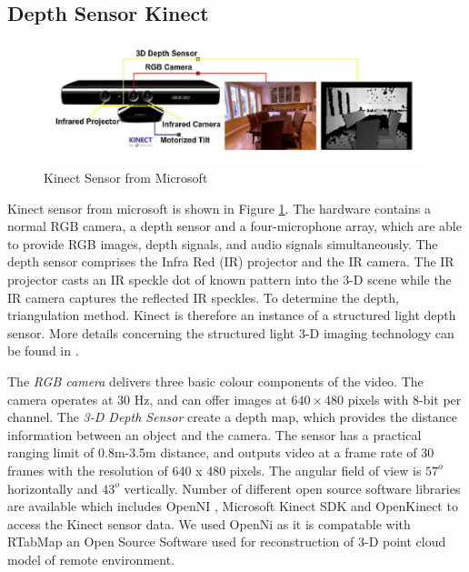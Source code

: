 \subsection{Depth Sensor Kinect}
\begin{figure}
	\includegraphics[width=\linewidth,keepaspectratio]{Chapter7/fig/kinect}
	\caption{Kinect Sensor from Microsoft}	\label{fig:Kinect}
\end{figure}
Kinect sensor from microsoft is shown in Figure \ref{fig:Kinect}. The hardware contains a normal RGB camera, a depth sensor and a four-microphone array, which are able to provide  RGB images,  depth signals, and audio signals simultaneously. The depth sensor comprises the Infra Red (IR) projector and the IR camera. The IR projector casts an IR speckle dot of known  pattern into the 3-D scene while the IR camera captures the reflected IR speckles. To determine the depth, triangulation method.  Kinect is therefore an instance of a structured light depth sensor. More details concerning the structured light 3-D imaging technology can be found in \cite{geng2011structured}. 

The \textit{RGB camera}  delivers three basic colour components of the video. The camera operates at 30 Hz, and can offer images at $640\times480$ pixels with 8-bit per channel. The  \textit{3-D Depth Sensor} create a depth map, which provides the distance information between an object and the camera. The sensor has a practical ranging limit of 0.8m-3.5m distance, and outputs video at a frame rate of 30 frames with the resolution of 640 x 480 pixels. The angular field of view is $57^o$ horizontally and $43^o$ vertically.
Number of different open source software libraries are available  which includes OpenNI \cite{openni} , Microsoft Kinect SDK  \cite{mssdk} and OpenKinect \cite{freenect} to access the Kinect sensor data. We used OpenNi as it is compatable with RTabMap an Open Source Software used for reconstruction of 3-D point cloud model of remote environment. 

